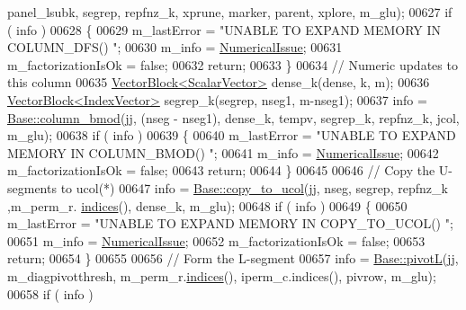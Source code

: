 \begin{DoxyCode}
      panel\_lsubk, segrep, repfnz\_k, xprune, marker, parent, xplore, m\_glu); 
00627       \textcolor{keywordflow}{if} ( info ) 
00628       \{
00629         m\_lastError =  \textcolor{stringliteral}{"UNABLE TO EXPAND MEMORY IN COLUMN\_DFS() "};
00630         m\_info = \hyperlink{group__enums_gga85fad7b87587764e5cf6b513a9e0ee5eaaf9b736d310a664e7729d163a035cc5f}{NumericalIssue}; 
00631         m\_factorizationIsOk = \textcolor{keyword}{false}; 
00632         \textcolor{keywordflow}{return}; 
00633       \}
00634       \textcolor{comment}{// Numeric updates to this column }
00635       \hyperlink{group___core___module_class_eigen_1_1_vector_block}{VectorBlock<ScalarVector>} dense\_k(dense, k, m); 
00636       \hyperlink{group___core___module_class_eigen_1_1_vector_block}{VectorBlock<IndexVector>} segrep\_k(segrep, nseg1, m-nseg1); 
00637       info = \hyperlink{group___sparse_l_u___module_ae34275602cf12560edfcaf7cd5cbe932}{Base::column\_bmod}(jj, (nseg - nseg1), dense\_k, tempv, segrep\_k, repfnz\_k, 
      jcol, m\_glu); 
00638       \textcolor{keywordflow}{if} ( info ) 
00639       \{
00640         m\_lastError = \textcolor{stringliteral}{"UNABLE TO EXPAND MEMORY IN COLUMN\_BMOD() "};
00641         m\_info = \hyperlink{group__enums_gga85fad7b87587764e5cf6b513a9e0ee5eaaf9b736d310a664e7729d163a035cc5f}{NumericalIssue}; 
00642         m\_factorizationIsOk = \textcolor{keyword}{false}; 
00643         \textcolor{keywordflow}{return}; 
00644       \}
00645       
00646       \textcolor{comment}{// Copy the U-segments to ucol(*)}
00647       info = \hyperlink{group___sparse_l_u___module_ae4867ed1d5f104f9245411c356416a21}{Base::copy\_to\_ucol}(jj, nseg, segrep, repfnz\_k ,m\_perm\_r.
      \hyperlink{group___core___module_a2f1ab379207fcd1ceb33941e25cf50c2}{indices}(), dense\_k, m\_glu); 
00648       \textcolor{keywordflow}{if} ( info ) 
00649       \{
00650         m\_lastError = \textcolor{stringliteral}{"UNABLE TO EXPAND MEMORY IN COPY\_TO\_UCOL() "};
00651         m\_info = \hyperlink{group__enums_gga85fad7b87587764e5cf6b513a9e0ee5eaaf9b736d310a664e7729d163a035cc5f}{NumericalIssue}; 
00652         m\_factorizationIsOk = \textcolor{keyword}{false}; 
00653         \textcolor{keywordflow}{return}; 
00654       \}
00655       
00656       \textcolor{comment}{// Form the L-segment }
00657       info = \hyperlink{group___sparse_l_u___module_ab5f56947465b829f8d523575724c3ac6}{Base::pivotL}(jj, m\_diagpivotthresh, m\_perm\_r.\hyperlink{group___core___module_a2f1ab379207fcd1ceb33941e25cf50c2}{indices}(), iperm\_c.indices(), 
      pivrow, m\_glu);
00658       \textcolor{keywordflow}{if} ( info ) 

\end{DoxyCode}

